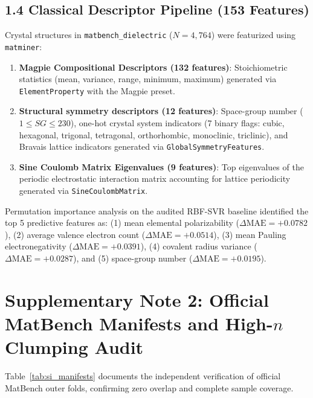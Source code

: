 \documentclass[journal,article,submit,moreauthors,pdftex]{article}
\begin{document}
\subsection*{1.4 Classical Descriptor Pipeline (153 Features)}
Crystal structures in \texttt{matbench\_dielectric} ($N = 4{,}764$) were featurized using \texttt{matminer}:
\begin{enumerate}
    \item \textbf{Magpie Compositional Descriptors (132 features)}: Stoichiometric statistics (mean, variance, range, minimum, maximum) generated via \texttt{ElementProperty} with the Magpie preset.
    \item \textbf{Structural symmetry descriptors (12 features)}: Space-group number ($1 \le SG \le 230$), one-hot crystal system indicators (7 binary flags: cubic, hexagonal, trigonal, tetragonal, orthorhombic, monoclinic, triclinic), and Bravais lattice indicators generated via \texttt{GlobalSymmetryFeatures}.
    \item \textbf{Sine Coulomb Matrix Eigenvalues (9 features)}: Top eigenvalues of the periodic electrostatic interaction matrix accounting for lattice periodicity generated via \texttt{SineCoulombMatrix}.
\end{enumerate}
Permutation importance analysis on the audited RBF-SVR baseline identified the top 5 predictive features as: (1) mean elemental polarizability ($\Delta \mathrm{MAE} = +0.0782$), (2) average valence electron count ($\Delta \mathrm{MAE} = +0.0514$), (3) mean Pauling electronegativity ($\Delta \mathrm{MAE} = +0.0391$), (4) covalent radius variance ($\Delta \mathrm{MAE} = +0.0287$), and (5) space-group number ($\Delta \mathrm{MAE} = +0.0195$).

\section*{Supplementary Note 2: Official MatBench Manifests and High-$n$ Clumping Audit}

Table~\ref{tab:si_manifests} documents the independent verification of official MatBench outer folds, confirming zero overlap and complete sample coverage.
\end{document}
